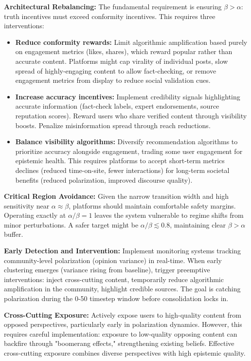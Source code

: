 \documentclass[11pt,a4paper]{article}
\begin{document}
\textbf{Architectural Rebalancing:} The fundamental requirement is ensuring $\beta > \alpha$: truth incentives must exceed conformity incentives. This requires three interventions:

\begin{itemize}
\item \textbf{Reduce conformity rewards:} Limit algorithmic amplification based purely on engagement metrics (likes, shares), which reward popular rather than accurate content. Platforms might cap virality of individual posts, slow spread of highly-engaging content to allow fact-checking, or remove engagement metrics from display to reduce social validation cues.

\item \textbf{Increase accuracy incentives:} Implement credibility signals highlighting accurate information (fact-check labels, expert endorsements, source reputation scores). Reward users who share verified content through visibility boosts. Penalize misinformation spread through reach reductions.

\item \textbf{Balance visibility algorithms:} Diversify recommendation algorithms to prioritize accuracy alongside engagement, trading some user engagement for epistemic health. This requires platforms to accept short-term metrics declines (reduced time-on-site, fewer interactions) for long-term societal benefits (reduced polarization, improved discourse quality).
\end{itemize}

\textbf{Critical Region Avoidance:} Given the narrow transition width and high sensitivity near $\alpha \approx \beta$, platforms should maintain comfortable safety margins. Operating exactly at $\alpha/\beta = 1$ leaves the system vulnerable to regime shifts from minor perturbations. A safer target might be $\alpha/\beta \lesssim 0.8$, maintaining clear $\beta > \alpha$ buffer.

\textbf{Early Detection and Intervention:} Implement monitoring systems tracking community-level polarization (opinion variance) in real-time. When early clustering emerges (variance rising from baseline), trigger preemptive interventions: inject cross-cutting content, temporarily reduce algorithmic amplification in the community, highlight credible sources. The goal is catching polarization during the 0-50 timestep window before consolidation locks in.

\textbf{Cross-Cutting Exposure:} Actively expose users to high-quality content from opposed perspectives, particularly early in polarization dynamics. However, this requires careful implementation: exposure to low-quality opposing content can backfire through "boomerang effects," strengthening existing beliefs. Effective cross-cutting exposure combines diverse perspectives with high epistemic quality.
\end{document}
